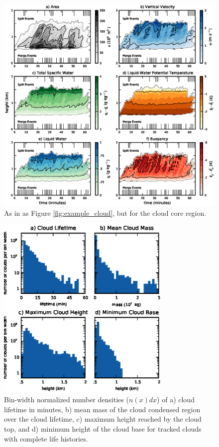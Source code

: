 \documentclass[acp]{copernicus}
\begin{document}
\begin{figure}[t]
\vspace*{2mm}
\begin{center}
\includegraphics[width=\textwidth]{./figures/example_core}
\end{center}
\caption{As in as Figure \ref{fig:example_cloud}, but for the cloud core region.}
\label{fig:example_core}
\end{figure}

\begin{figure}[t]
\vspace*{2mm}
\begin{center}
\includegraphics[width=8.3cm]{./figures/cloud_stats}
\end{center}
\caption{Bin-width normalized number densities ($n(x)dx$) of a) cloud lifetime 
in minutes, b) mean mass of the cloud condensed region over the cloud lifetime, 
c) maximum height reached by the cloud top, and d) minimum height of the cloud 
base for tracked clouds with complete life histories.}
\label{fig:cloud_stats}
\end{figure}
\end{document}
